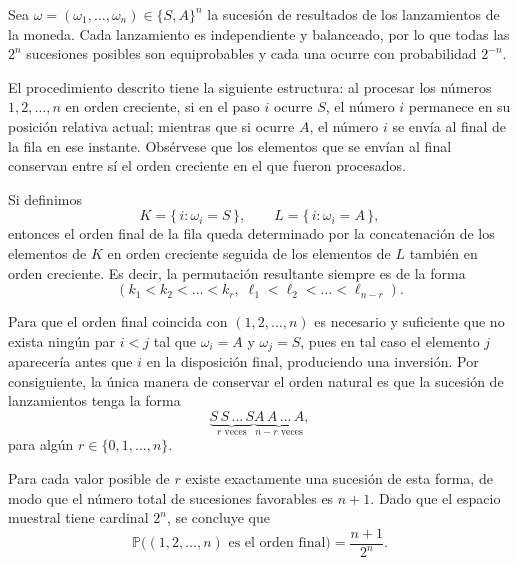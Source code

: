 \documentclass[12pt,a4paper]{article}
\begin{document}
    \begin{solucion}
        Sea $\omega=(\omega_1,\dots,\omega_n)\in\{S,A\}^n$ la sucesión de resultados de los lanzamientos de la moneda. 
        Cada lanzamiento es independiente y balanceado, por lo que todas las $2^n$ sucesiones posibles son equiprobables y cada una ocurre con probabilidad $2^{-n}$.

        El procedimiento descrito tiene la siguiente estructura: al procesar los números $1,2,\dots,n$ en orden creciente, si en el paso $i$ ocurre $S$, el número $i$ permanece en su posición relativa actual; mientras que si ocurre $A$, el número $i$ se envía al final de la fila en ese instante. Obsérvese que los elementos que se envían al final conservan entre sí el orden creciente en el que fueron procesados.

        Si definimos
        \[
        K=\{\, i : \omega_i=S \,\}, 
        \qquad 
        L=\{\, i : \omega_i=A \,\},
        \]
        entonces el orden final de la fila queda determinado por la concatenación de los elementos de $K$ en orden creciente seguida de los elementos de $L$ también en orden creciente. Es decir, la permutación resultante siempre es de la forma
        \[
        (k_1<k_2<\dots<k_r,\;\ell_1<\ell_2<\dots<\ell_{n-r}).
        \]

        Para que el orden final coincida con $(1,2,\dots,n)$ es necesario y suficiente que no exista ningún par $i<j$ tal que $\omega_i=A$ y $\omega_j=S$, pues en tal caso el elemento $j$ aparecería antes que $i$ en la disposición final, produciendo una inversión. Por consiguiente, la única manera de conservar el orden natural es que la sucesión de lanzamientos tenga la forma
        \[
        \underbrace{S\,S\,\dots\,S}_{r\text{ veces}}
        \underbrace{A\,A\,\dots\,A}_{n-r\text{ veces}},
        \]
        para algún $r\in\{0,1,\dots,n\}$.

        Para cada valor posible de $r$ existe exactamente una sucesión de esta forma, de modo que el número total de sucesiones favorables es $n+1$. Dado que el espacio muestral tiene cardinal $2^n$, se concluye que
        \[
        \mathbb{P}\big((1,2,\dots,n)\text{ es el orden final}\big)
        =
        \frac{n+1}{2^n}.
        \]
    \end{solucion}
\end{document}
